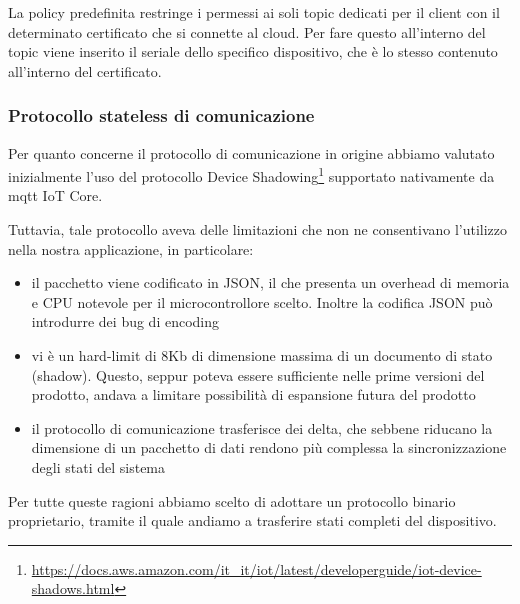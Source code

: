 \documentclass[12pt,a4paper,twoside,titlepage]{book}
\begin{document}
La policy predefinita restringe i permessi ai soli \gls{topic} dedicati per il client con il determinato certificato
che si connette al cloud. Per fare questo all'interno del \gls{topic} viene inserito il seriale dello specifico
dispositivo, che è lo stesso contenuto all'interno del certificato.

\subsubsection{Protocollo stateless di comunicazione}

Per quanto concerne il protocollo di comunicazione in origine abbiamo valutato inizialmente
l'uso del protocollo Device Shadowing\footnote{\url{https://docs.aws.amazon.com/it\_it/iot/latest/developerguide/iot-device-shadows.html}}
supportato nativamente da \Gls{mqtt} IoT Core.

Tuttavia, tale protocollo aveva delle limitazioni che non ne consentivano l'utilizzo nella nostra
applicazione, in particolare:

\begin{itemize}
    \item il pacchetto viene codificato in JSON, il che presenta un overhead di memoria
        e CPU notevole per il microcontrollore scelto. Inoltre la codifica JSON può
        introdurre dei bug di encoding
    \item vi è un hard-limit di 8Kb di dimensione massima di un documento di stato (shadow).
        Questo, seppur poteva essere sufficiente nelle prime versioni del prodotto, andava
        a limitare possibilità di espansione futura del prodotto
    \item il protocollo di comunicazione trasferisce dei delta, che sebbene riducano la
        dimensione di un pacchetto di dati rendono più complessa la sincronizzazione degli
        stati del sistema
\end{itemize}

Per tutte queste ragioni abbiamo scelto di adottare un protocollo binario proprietario,
tramite il quale andiamo a trasferire stati completi del dispositivo.
\end{document}
